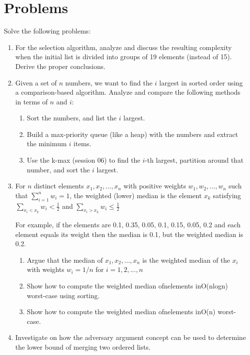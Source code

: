 \documentclass{article}
\begin{document}
\section{Problems}
Solve the following problems:
\begin{enumerate}
    \item For the selection algorithm, analyze and discuss the resulting complexity when the initial list is divided into groups of 19 elements (instead of 15). Derive the proper conclusions.

    \item Given  a  set  of $n$ numbers,  we  want  to  find  the $i$ largest  in  sorted  order  using  a  comparison-based algorithm. Analyze and compare the following methods in terms of $n$ and $i$:
    \begin{enumerate}
        \item Sort the numbers, and list the $i$ largest.
        \item Build a max-priority queue (like a heap) with the numbers and extract the minimum $i$ items.
        \item Use the k-max (session 06) to find the $i$-th largest, partition around that number, and sort the $i$ largest.
    \end{enumerate}

    \item For $n$ distinct elements $x_1, x_2, ..., x_n$ with positive weights $w_1, w_2, ..., w_n$ such that $\sum^{n}_{i=1} w_i= 1$, the weighted (lower) median is the element $x_k$ satisfying $\sum_{x_i<x_k}w_i < \frac{1}{2}$ and $\sum_{x_i>x_k}w_i \leq \frac{1}{2}$

    For example, if the elements are 0.1, 0.35, 0.05, 0.1, 0.15, 0.05, 0.2 and each element equals its weight then the median is 0.1, but the weighted median is 0.2.
    \begin{enumerate}
        \item Argue that the median of $x_1, x_2, ..., x_n$ is the weighted median of the $x_i$ with weights $w_i= 1/n$ for $i= 1,2, ..., n$
        \item Show how to compute the weighted median ofnelements inO(nlogn) worst-case using sorting.
        \item Show how to compute the weighted median ofnelements inO(n) worst-case.
    \end{enumerate}

    \item Investigate  on  how  the  adversary  argument  concept  can  be  used  to  determine  the  lower  bound  of merging two ordered lists.
\end{enumerate}
\end{document}
